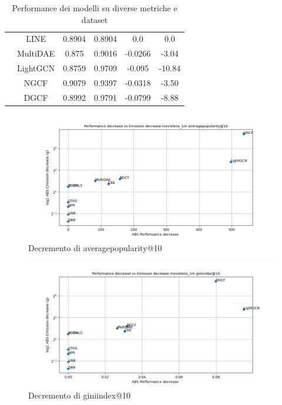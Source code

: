 \begin{table}[H]
{\begin{tabular}{|c|c|c|c|c|c|}
            & LINE     & 0.8904 & 0.8904 & 0.0      & 0.0       \\ \cline{2-6}
            & MultiDAE & 0.875  & 0.9016 & -0.0266  & -3.04     \\ \cline{2-6}
            & LightGCN & 0.8759 & 0.9709 & -0.095   & -10.84   \\ \cline{2-6}
            & NGCF     & 0.9079 & 0.9397 & -0.0318  & -3.50   \\ \cline{2-6}
            & DGCF     & 0.8992 & 0.9791 & -0.0799  & -8.88   \\ \hline
        \end{tabular}
    }
    \caption{Performance dei modelli su diverse metriche e dataset}
\end{table}



\begin{figure}[H]
    \centering
     \includegraphics[width=\textwidth]{images/decrement_averagepopularity@10_movielens_1m_30_7.png}
    \caption{Decremento di averagepopularity@10}
\end{figure}

\begin{figure}[H]
    \centering
     \includegraphics[width=\textwidth]{images/decrement_giniindex@10_movielens_1m_30_7.png}
    \caption{Decremento di giniindex@10}
\end{figure}

